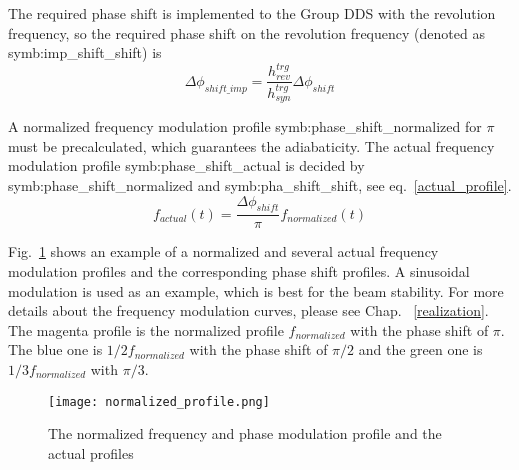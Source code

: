The required phase shift is implemented to the Group DDS with the revolution frequency, so the required phase shift on the revolution frequency (denoted as \gls{symb:imp_shift_shift}) is 
\begin{equation}
\Delta \phi_\mathit{shift\_imp}= \frac{h_{\mathit{rev}}^{trg}}{h_{\mathit{syn}}^{trg}}\Delta \phi_\mathit{shift}
\end{equation}

A normalized frequency modulation profile \gls{symb:phase_shift_normalized} for $\pi$ must be precalculated, which guarantees the adiabaticity. The actual frequency modulation profile \gls{symb:phase_shift_actual} is decided by \gls{symb:phase_shift_normalized} and \gls{symb:pha_shift_shift}, see eq.~\ref{actual_profile}. 
\begin{equation}
f_{\mathit{actual}}(t)=\frac{\Delta \phi_\mathit{shift}}{\pi}f_{\mathit{normalized}}(t) \label{actual_profile}
\end{equation}

Fig.~\ref{normalized_profile} shows an example of a normalized and several actual frequency modulation profiles and the corresponding phase shift profiles. A sinusoidal modulation is used as an example, which is best for the beam stability. For more details about the frequency modulation curves, please see Chap. ~\ref{realization}. The magenta profile is the normalized profile $f_{normalized}$ with the phase shift of $\pi$. The blue one is $1/2 f_{\mathit{normalized}}$ with the phase shift of $\pi/2$ and the green one is $1/3 f_{\mathit{normalized}}$ with $\pi/3$. 

\begin{figure}[!htb]
   \centering   
   \texttt{[image: normalized\_profile.png]}
   \caption{The normalized frequency and phase modulation profile and the actual profiles}
   \label{normalized_profile}
\end{figure}  

